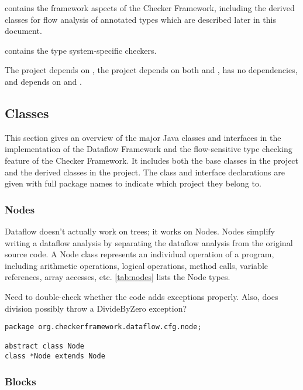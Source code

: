  contains the framework aspects of the Checker
Framework, including the derived classes for flow analysis of
annotated types which are described later in this document.

 contains the type system-specific checkers.

The  project depends on , the
 project depends on both  and
,  has no dependencies, and
 depends on  and .


\subsection{Classes}

This section gives an overview of the major Java classes and
interfaces in the implementation of the Dataflow Framework and the
flow-sensitive type checking feature of the Checker Framework.  It
includes both the base classes in the  project and the
derived classes in the  project.  The class and
interface declarations are given with full package names to indicate
which project they belong to.

\subsubsection{Nodes}
\label{sec:node_classes}

Dataflow doesn't actually work on trees; it works on Nodes. Nodes
simplify writing a dataflow analysis by separating the dataflow
analysis from the original source code.
A Node class represents an individual operation of a program,
including arithmetic operations, logical operations, method calls,
variable references, array accesses, etc.  \autoref{tab:nodes} lists
the Node types.

\begin{workinprogress}
Need to double-check whether the code adds exceptions properly.  Also, does
division possibly throw a DivideByZero exception?
\end{workinprogress}

\begin{verbatim}
package org.checkerframework.dataflow.cfg.node;

abstract class Node
class *Node extends Node
\end{verbatim}


\subsubsection{Blocks}
\label{sec:block_classes}

